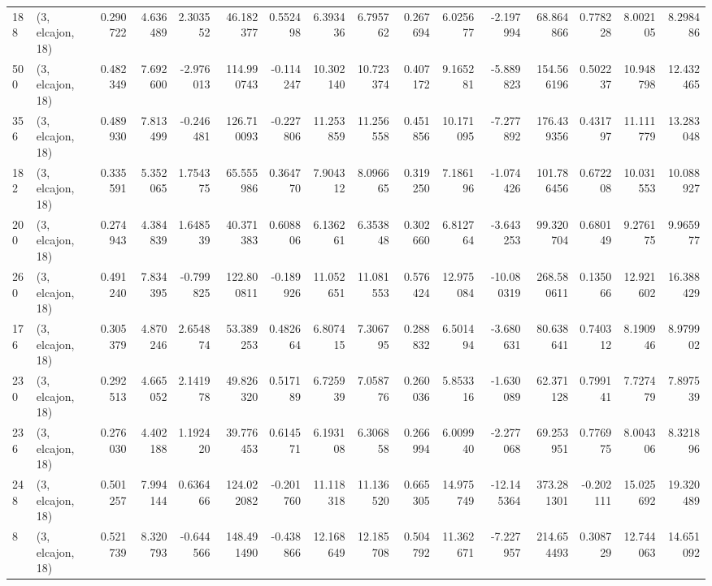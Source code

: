 \begin{tabular}{llrrrrrrrrrrrrrr}
188 &  (3, elcajon, 18) &   0.290722 &   4.636489 &   2.303552 &    46.182377 &   0.552498 &   6.393436 &   6.795762 &  0.267694 &   6.025677 &  -2.197994 &    68.864866 &  0.778228 &   8.002105 &   8.298486 \\
500 &  (3, elcajon, 18) &   0.482349 &   7.692600 &  -2.976013 &   114.990743 &  -0.114247 &  10.302140 &  10.723374 &  0.407172 &   9.165281 &  -5.889823 &   154.566196 &  0.502237 &  10.948798 &  12.432465 \\
356 &  (3, elcajon, 18) &   0.489930 &   7.813499 &  -0.246481 &   126.710093 &  -0.227806 &  11.253859 &  11.256558 &  0.451856 &  10.171095 &  -7.277892 &   176.439356 &  0.431797 &  11.111779 &  13.283048 \\
182 &  (3, elcajon, 18) &   0.335591 &   5.352065 &   1.754375 &    65.555986 &   0.364770 &   7.904312 &   8.096665 &  0.319250 &   7.186196 &  -1.074426 &   101.786456 &  0.672208 &  10.031553 &  10.088927 \\
200 &  (3, elcajon, 18) &   0.274943 &   4.384839 &   1.648539 &    40.371383 &   0.608806 &   6.136261 &   6.353848 &  0.302660 &   6.812764 &  -3.643253 &    99.320704 &  0.680149 &   9.276175 &   9.965977 \\
260 &  (3, elcajon, 18) &   0.491240 &   7.834395 &  -0.799825 &   122.800811 &  -0.189926 &  11.052651 &  11.081553 &  0.576424 &  12.975084 & -10.080319 &   268.580611 &  0.135066 &  12.921602 &  16.388429 \\
176 &  (3, elcajon, 18) &   0.305379 &   4.870246 &   2.654874 &    53.389253 &   0.482664 &   6.807415 &   7.306795 &  0.288832 &   6.501494 &  -3.680631 &    80.638641 &  0.740312 &   8.190946 &   8.979902 \\
230 &  (3, elcajon, 18) &   0.292513 &   4.665052 &   2.141978 &    49.826320 &   0.517189 &   6.725939 &   7.058776 &  0.260036 &   5.853316 &  -1.630089 &    62.371128 &  0.799141 &   7.727479 &   7.897539 \\
236 &  (3, elcajon, 18) &   0.276030 &   4.402188 &   1.192420 &    39.776453 &   0.614571 &   6.193108 &   6.306858 &  0.266994 &   6.009940 &  -2.277068 &    69.253951 &  0.776975 &   8.004306 &   8.321896 \\
248 &  (3, elcajon, 18) &   0.501257 &   7.994144 &   0.636466 &   124.022082 &  -0.201760 &  11.118318 &  11.136520 &  0.665305 &  14.975749 & -12.145364 &   373.281301 & -0.202111 &  15.025692 &  19.320489 \\
8   &  (3, elcajon, 18) &   0.521739 &   8.320793 &  -0.644566 &   148.491490 &  -0.438866 &  12.168649 &  12.185708 &  0.504792 &  11.362671 &  -7.227957 &   214.654493 &  0.308729 &  12.744063 &  14.651092 \\

\end{tabular}
